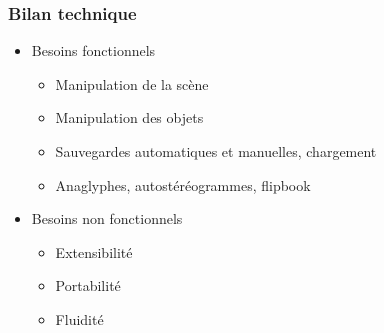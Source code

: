 \documentclass{beamer}
\begin{document}
\begin{frame}
\frametitle{Bilan technique}
\begin{itemize}[label=$\bullet$]
\item Besoins fonctionnels
	\begin{itemize}[label=$\checkmark$]
	\item Manipulation de la scène
	\item Manipulation des objets
	\item Sauvegardes automatiques et manuelles, chargement
	\item Anaglyphes, autostéréogrammes, flipbook
	\end{itemize}
\item Besoins non fonctionnels
	\begin{itemize}[label=$\checkmark$]
	\item Extensibilité
	\item Portabilité  
	\item Fluidité %
	\end{itemize}
\end{itemize}

\end{frame}

\end{document}
